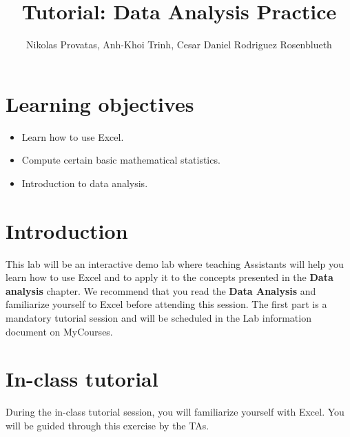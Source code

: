 \documentclass[12pt]{article}
\title{Tutorial: Data Analysis Practice}
\author{Nikolas Provatas, Anh-Khoi Trinh, Cesar Daniel Rodriguez Rosenblueth}
\date{}
\begin{document}
\maketitle

\section{Learning objectives}
\begin{itemize}
\item Learn how to use Excel.
\item Compute certain basic mathematical statistics.
\item Introduction to data analysis.
\end{itemize}

\section{Introduction}
This lab will be an interactive demo lab where teaching Assistants will help you  learn how to use Excel and to apply it to the concepts presented in the \textbf{Data analysis} chapter. We recommend that you read the \textbf{Data Analysis} and familiarize yourself to Excel before attending this session. The first part is a mandatory tutorial session and will be scheduled in the Lab information document on MyCourses.

\section{In-class tutorial}
During the in-class tutorial session, you will familiarize yourself with Excel. You will be guided through this exercise by the TAs.
\end{document}
